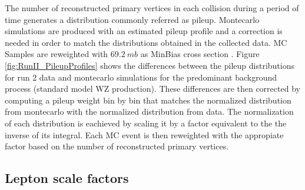 The number of reconstructed primary vertices in each collision during a period
of time generates a distribution commonly referred as pileup. Montecarlo simulations
are produced with an estimated pileup profile and a correction is needed
in order to match the distributions obtained in the collected data.
MC Samples are reweighted with $69.2~mb$ as MinBias cross section \cite{pureweight}.
Figure \ref{fig:RunII_PileupProfiles} shows the differences between the
pileup distributions for run 2 data and montecarlo
simulations for the predominant background process (standard model
WZ production). These differences are then
corrected by computing a pileup weight bin by bin that matches the normalized
distribution from montecarlo with the normalized distribution from data.
The normalization of each distribution is eachieved by scaling it by a factor
equivalent to the the inverse of its integral. Each MC event is then reweighted
with the appropiate factor based on the number of reconstructed primary vertices. 

\subsection{Lepton scale factors}

